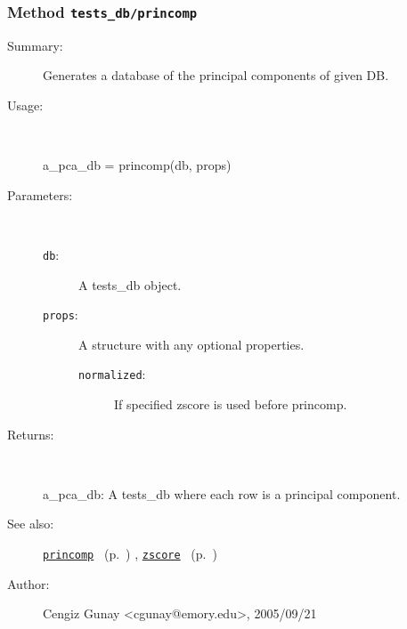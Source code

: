 \subsubsection[Method \texttt{princomp}]{Method \texttt{tests\_db/princomp}}%
%
\label{ref_tests_db__princomp}%
\hypertarget{ref_tests_db__princomp}{}%
\begin{description}
\item[Summary:]Generates a database of the principal components of given DB.
%
\item[Usage:]~%
\begin{lyxcode}%
a\_pca\_db = princomp(db, props)
%
\end{lyxcode}%
%
%
\item[Parameters:]~
\begin{description}%
\item[\texttt{db}:]
 A tests\_db object.
\item[\texttt{props}:]
 A structure with any optional properties.
\begin{description}%
\item[\texttt{normalized}:]
 If specified zscore is used before princomp.
\end{description}%
\end{description}%
%
\item[Returns:
]~

	a\_pca\_db: A tests\_db where each row is a principal component.
%
%
\item[See also:]%
\hyperlink{ref_princomp}{\texttt{princomp}}%
\ (p.~\pageref{ref_princomp})%
%
, \hyperlink{ref_zscore}{\texttt{zscore}}%
\ (p.~\pageref{ref_zscore})%
%
%
\item[Author:]%
Cengiz Gunay <cgunay@emory.edu>, 2005/09/21
%
\end{description}
\methodline%
